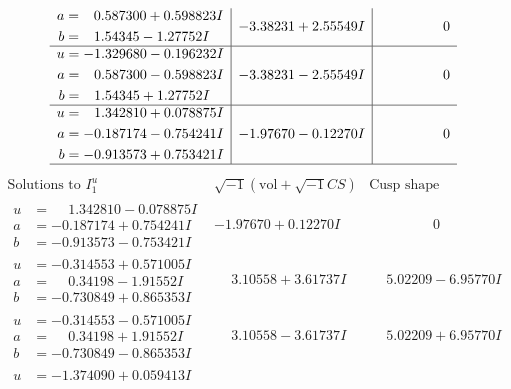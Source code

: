 \documentclass[1p]{elsarticle_modified}
\theoremstyle{definition}
\newcommand{\I}{\sqrt{-1}}
\begin{document}
$$\begin{array}{c|c|c}
\begin{aligned}
a &= \phantom{-}0.587300 + 0.598823 I \\
b &= \phantom{-}1.54345 - 1.27752 I\end{aligned}
 & -3.38231 + 2.55549 I & \phantom{-0.000000 } 0 \\ \hline\begin{aligned}
u &= -1.329680 - 0.196232 I \\
a &= \phantom{-}0.587300 - 0.598823 I \\
b &= \phantom{-}1.54345 + 1.27752 I\end{aligned}
 & -3.38231 - 2.55549 I & \phantom{-0.000000 } 0 \\ \hline\begin{aligned}
u &= \phantom{-}1.342810 + 0.078875 I \\
a &= -0.187174 - 0.754241 I \\
b &= -0.913573 + 0.753421 I\end{aligned}
 & -1.97670 - 0.12270 I & \phantom{-0.000000 } 0\\
 \hline 
 \end{array}$$\newpage$$\begin{array}{c|c|c}  
\text{Solutions to }I^u_{1}& \I (\text{vol} + \sqrt{-1}CS) & \text{Cusp shape}\\
 \hline 
\begin{aligned}
u &= \phantom{-}1.342810 - 0.078875 I \\
a &= -0.187174 + 0.754241 I \\
b &= -0.913573 - 0.753421 I\end{aligned}
 & -1.97670 + 0.12270 I & \phantom{-0.000000 } 0 \\ \hline\begin{aligned}
u &= -0.314553 + 0.571005 I \\
a &= \phantom{-}0.34198 - 1.91552 I \\
b &= -0.730849 + 0.865353 I\end{aligned}
 & \phantom{-}3.10558 + 3.61737 I & \phantom{-}5.02209 - 6.95770 I \\ \hline\begin{aligned}
u &= -0.314553 - 0.571005 I \\
a &= \phantom{-}0.34198 + 1.91552 I \\
b &= -0.730849 - 0.865353 I\end{aligned}
 & \phantom{-}3.10558 - 3.61737 I & \phantom{-}5.02209 + 6.95770 I \\ \hline\begin{aligned}
u &= -1.374090 + 0.059413 I \\

\end{aligned}
\end{array}$$
\end{document}
